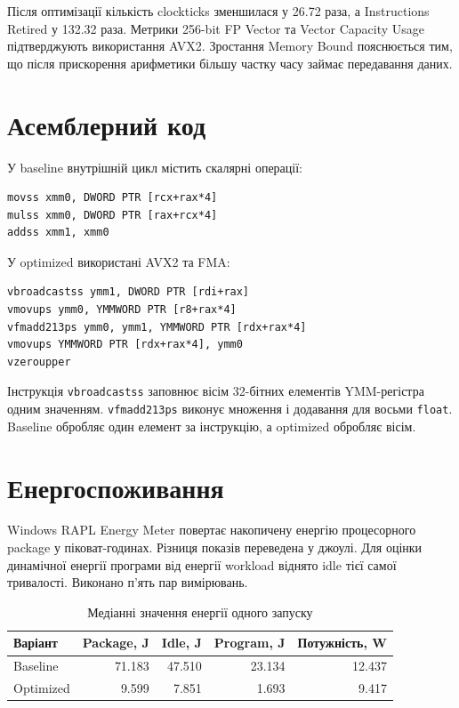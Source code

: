 \documentclass[12pt,a4paper]{article}
\begin{document}
Після оптимізації кількість clockticks зменшилася у 26.72 раза, а Instructions Retired у 132.32 раза. Метрики 256-bit FP Vector та Vector Capacity Usage підтверджують використання AVX2. Зростання Memory Bound пояснюється тим, що після прискорення арифметики більшу частку часу займає передавання даних.

\section{Асемблерний код}

У baseline внутрішній цикл містить скалярні операції:

\begin{lstlisting}
movss xmm0, DWORD PTR [rcx+rax*4]
mulss xmm0, DWORD PTR [rax+rcx*4]
addss xmm1, xmm0
\end{lstlisting}

У optimized використані AVX2 та FMA:

\begin{lstlisting}
vbroadcastss ymm1, DWORD PTR [rdi+rax]
vmovups ymm0, YMMWORD PTR [r8+rax*4]
vfmadd213ps ymm0, ymm1, YMMWORD PTR [rdx+rax*4]
vmovups YMMWORD PTR [rdx+rax*4], ymm0
vzeroupper
\end{lstlisting}

Інструкція \texttt{vbroadcastss} заповнює вісім 32-бітних елементів YMM-регістра одним значенням. \texttt{vfmadd213ps} виконує множення і додавання для восьми \texttt{float}. Baseline обробляє один елемент за інструкцію, а optimized обробляє вісім.

\section{Енергоспоживання}

Windows RAPL Energy Meter повертає накопичену енергію процесорного package у піковат-годинах. Різниця показів переведена у джоулі. Для оцінки динамічної енергії програми від енергії workload віднято idle тієї самої тривалості. Виконано п'ять пар вимірювань.

\begin{table}[H]
\centering
\begin{tabular}{@{}lrrrr@{}}
\toprule
Варіант & Package, J & Idle, J & Program, J & Потужність, W \\
\midrule
Baseline & 71.183 & 47.510 & 23.134 & 12.437 \\
Optimized & 9.599 & 7.851 & 1.693 & 9.417 \\
\bottomrule
\end{tabular}
\caption{Медіанні значення енергії одного запуску}
\end{table}
\end{document}
